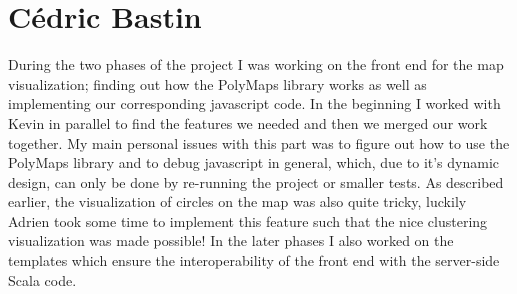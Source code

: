 \section{C\'{e}dric Bastin}

During the two phases of the project I was working on the front end for the map visualization; finding out how the PolyMaps library works as well as implementing our corresponding javascript code. In the beginning I worked with Kevin in parallel to find the features we needed and then we merged our work together. My main personal issues with this part was to figure out how to use the PolyMaps library and to debug javascript in general, which, due to it's dynamic design, can only be done by re-running the project or smaller tests. As described earlier, the visualization of circles on the map was also quite tricky, luckily Adrien took some time to implement this feature such that the nice clustering visualization was made possible! In the later phases I also worked on the templates which ensure the interoperability of the front end with the server-side Scala code.